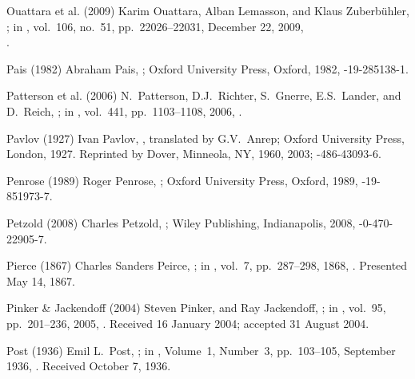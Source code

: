 \biblabel Ouattara et al. (2009)
Karim Ouattara, Alban Lemasson, and Klaus Zuberbühler,\\
;
in ,
vol.\ 106, no.\ 51, pp.\ 22026--22031, December 22, 2009,\\
.

\biblabel Pais (1982)
Abraham Pais,
;
Oxford University Press, Oxford, 1982,
-19-285138-1.

\biblabel Patterson et al. (2006)
N.\ Patterson, D.J.\ Richter, S.\ Gnerre, E.S.\ Lander, and D.\ Reich,
;
in ,
vol.\ 441, pp.\ 1103--1108, 2006,
.

\biblabel Pavlov (1927)
Ivan Pavlov,
,
translated by G.V.\ Anrep;
Oxford University Press, London, 1927.
Reprinted by Dover, Minneola, NY, 1960, 2003;
-486-43093-6.

\biblabel Penrose (1989)
Roger Penrose, \negthinspace
{};
Oxford University Press, Oxford, 1989,
-19-851973-7.

\biblabel Petzold (2008)
Charles Petzold,
;
Wiley Publishing, Indianapolis, 2008,
-0-470-22905-7.

\biblabel Pierce (1867)
Charles Sanders Peirce,
;
in ,
vol.\ 7, pp.\ 287--298, 1868,
.
Presented May 14, 1867.

\biblabel Pinker \& Jackendoff (2004)
Steven Pinker, and Ray Jackendoff,
;
in ,
vol.\ 95, pp.\ 201--236, 2005,
.
Received 16 January 2004; accepted 31 August 2004.

\biblabel Post (1936)
Emil L.\ Post,
;
in ,
Volume\ 1, Number\ 3, pp.~103--105, September 1936,
.
Received October 7, 1936.

